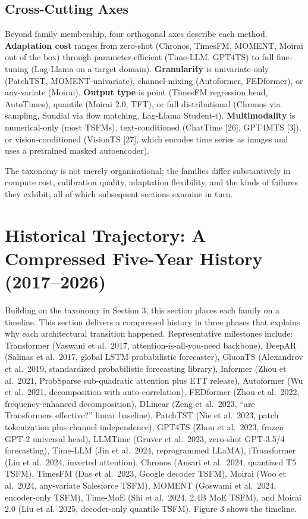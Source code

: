 \documentclass{article}
\begin{document}
\subsection{Cross-Cutting Axes}\label{cross-cutting-axes}

Beyond family membership, four orthogonal axes describe each method. \textbf{Adaptation cost} ranges from zero-shot (Chronos, TimesFM, MOMENT, Moirai out of the box) through parameter-efficient (Time-LLM, GPT4TS) to full fine-tuning (Lag-Llama on a target domain). \textbf{Granularity} is univariate-only (PatchTST, MOMENT-univariate), channel-mixing (Autoformer, FEDformer), or any-variate (Moirai). \textbf{Output type} is point (TimesFM regression head, AutoTimes), quantile (Moirai 2.0, TFT), or full distributional (Chronos via sampling, Sundial via flow matching, Lag-Llama Student-t). \textbf{Multimodality} is numerical-only (most TSFMs), text-conditioned (ChatTime {[}26{]}, GPT4MTS {[}3{]}), or vision-conditioned (VisionTS {[}27{]}, which encodes time series as images and uses a pretrained masked autoencoder).

The taxonomy is not merely organisational; the families differ substantively in compute cost, calibration quality, adaptation flexibility, and the kinds of failures they exhibit, all of which subsequent sections examine in turn.

\section{Historical Trajectory: A Compressed Five-Year History (2017--2026)}\label{historical-trajectory-a-compressed-five-year-history-20172026}

Building on the taxonomy in Section 3, this section places each family on a timeline. This section delivers a compressed history in three phases that explains why each architectural transition happened. Representative milestones include: Transformer (Vaswani et al.~2017, attention-is-all-you-need backbone), DeepAR (Salinas et al.~2017, global LSTM probabilistic forecaster), GluonTS (Alexandrov et al.~2019, standardized probabilistic forecasting library), Informer (Zhou et al.~2021, ProbSparse sub-quadratic attention plus ETT release), Autoformer (Wu et al.~2021, decomposition with auto-correlation), FEDformer (Zhou et al.~2022, frequency-enhanced decomposition), DLinear (Zeng et al.~2023, ``are Transformers effective?'' linear baseline), PatchTST (Nie et al.~2023, patch tokenization plus channel independence), GPT4TS (Zhou et al.~2023, frozen GPT-2 universal head), LLMTime (Gruver et al.~2023, zero-shot GPT-3.5/4 forecasting), Time-LLM (Jin et al.~2024, reprogrammed LLaMA), iTransformer (Liu et al.~2024, inverted attention), Chronos (Ansari et al.~2024, quantized T5 TSFM), TimesFM (Das et al.~2023, Google decoder TSFM), Moirai (Woo et al.~2024, any-variate Salesforce TSFM), MOMENT (Goswami et al.~2024, encoder-only TSFM), Time-MoE (Shi et al.~2024, 2.4B MoE TSFM), and Moirai 2.0 (Liu et al.~2025, decoder-only quantile TSFM). Figure 3 shows the timeline.
\end{document}
